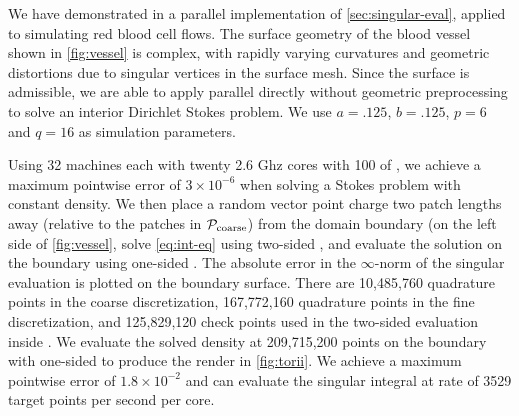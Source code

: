 We have demonstrated in \cite{lu2019scalable} a parallel implementation of \cref{sec:singular-eval}, applied to simulating red blood cell flows.
The surface geometry of the blood vessel shown in \cref{fig:vessel} is complex, with rapidly varying curvatures and geometric distortions due to singular vertices in the surface mesh.
Since the surface is admissible, we are able to apply parallel \qbkix directly without geometric preprocessing to solve an interior Dirichlet Stokes problem.
We use $a=.125$, $b=.125$, $p=6$ and $q=16$ as simulation parameters.

Using 32 machines each with twenty 2.6 Ghz cores with 100 of , we achieve a maximum pointwise error of $3\times 10^{-6}$ when solving a Stokes problem with constant density. 
We then place a random vector point charge two patch lengths away (relative to the patches in ${\mathcal{P}_{\mathrm{coarse}}}$) from the domain boundary (on the left side of \cref{fig:vessel}, solve \cref{eq:int-eq} using two-sided \qbkix, and evaluate the solution on the boundary using one-sided \qbkix.
The absolute error in the $\infty$-norm of the singular evaluation is plotted on the boundary surface.
There are 10,485,760 quadrature points in the coarse discretization, 167,772,160 quadrature points in the fine discretization, and 125,829,120 check points used in the two-sided \qbkix evaluation inside \gmres.
We evaluate the solved density at 209,715,200 points on the boundary with one-sided \qbkix to produce the render in \cref{fig:torii}.
We achieve a maximum pointwise error of $1.8\times 10^{-2}$ and can evaluate the singular integral at rate of 3529 target points per second per core. 

